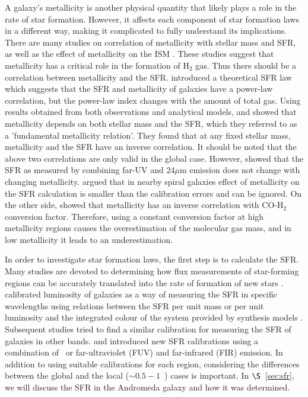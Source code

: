 A galaxy's metallicity is another physical quantity that likely plays a role in the rate of star formation. However, it affects each component of star formation laws in a different way, making it complicated to fully understand its implications. There are many studies on correlation of metallicity with stellar mass and SFR, as well as the effect of metallicity on the ISM \citep[e.g.][]{Boissier03, Leroy08, Krumholz09, Mannucci10, Dib11a, Lilly13}. These studies suggest that metallicity has a critical role in the formation of H$_2$ gas. Thus there should be a correlation between metallicity and the SFR. \citet{Krumholz09} introduced a theoretical SFR law which suggests that the SFR and metallicity of galaxies have a power-law correlation, but the power-law index changes with the amount of total gas. 
 Using results obtained from both observations and analytical models, \citet{Mannucci10} and \citet{Lilly13} showed that metallicity depends on both stellar mass and the SFR, which they referred to as a 'fundamental metallicity relation'. They found that at any fixed stellar mass, metallicity and the SFR have an inverse correlation. It should be noted that the above two correlations are only valid in the global case. However, \citet{Leroy08} showed that the SFR as measured by combining far-UV and 24$\mu$m emission does not change with changing metallicity. \citet{Roychowdhury15} argued that in nearby spiral galaxies effect of metallicity on the SFR calculation is smaller than the calibration errors and can be ignored. On the other side, \citet{Boissier03} showed that metallicity has an inverse correlation with CO-H$_2$ conversion factor. Therefore, using a constant conversion factor at high metallicity regions causes the overestimation of the molecular gas mass, and in low metallicity it leads to an underestimation.


In order to investigate star formation laws, the first step is to calculate the SFR. Many studies are devoted to determining how flux measurements of star-forming regions can be accurately translated into the rate of formation of new stars \citep[e.g.][]{Kennicutt12, Calzetti13, Zhu08, Kennicutt09, Boquien10, Boquien11, Hao11}. \citet{Kennicutt98b} calibrated luminosity of galaxies as a way of measuring the SFR in specific wavelengths using relations between the SFR per unit mass or per unit luminosity and the integrated colour of the system provided by synthesis models \citep[e.g.][]{Bruzual93}. Subsequent studies tried to find a similar calibration for measuring the SFR of galaxies in other bands. \citet{Kennicutt09} and \citet{Hao11} introduced new SFR calibrations using a combination of \halpha\ or far-ultraviolet (FUV) and far-infrared (FIR) emission. In addition to using suitable calibrations for each region, considering the differences between the global and the local ($\sim 0.5-1$~\kpc) cases is important. In $\S$~\ref{sec:sfr}, we will discuss the SFR in the Andromeda galaxy and how it was determined. 

